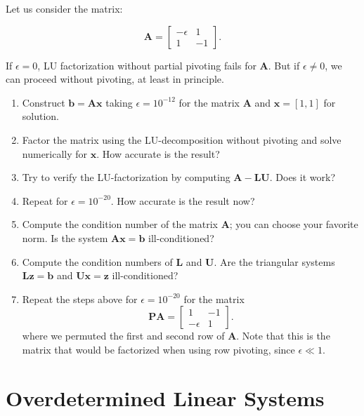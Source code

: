 \begin{exercise} 
    Let us consider the matrix:

    $$
        \mathbf{A} =
        \begin{bmatrix}
        -\epsilon & 1 \\ 
        1 & -1
        \end{bmatrix}.
    $$

    If $\epsilon=0$, LU factorization without partial pivoting fails for $\mathbf{A}$. But if $\epsilon\neq 0$, we can proceed without pivoting, at least in principle.

    \begin{enumerate}
        \item Construct $\mathbf{b}=\mathbf{Ax}$ taking $\epsilon=10^{-12}$ for the matrix $\mathbf{A}$ and $\mathbf{x}=[1,1]$ for solution.
        \item Factor the matrix using the LU-decomposition without pivoting and solve numerically for $\mathbf{x}$. How accurate is the result?
        \item Try to verify the LU-factorization by computing $\mathbf{A}-\mathbf{LU}$. Does it work?
        \item Repeat for $\epsilon=10^{-20}$. How accurate is the result now?
        \item Compute the condition number of the matrix $\mathbf{A}$; you can choose your favorite norm. Is the system $\mathbf{Ax}=\mathbf{b}$ ill-conditioned?
        \item Compute the condition numbers of $\mathbf{L}$ and $\mathbf{U}$. Are the triangular systems $\mathbf{L}\mathbf{z}=\mathbf{b}$ and $\mathbf{U}\mathbf{x}=\mathbf{z}$ ill-conditioned?
        \item Repeat the steps above for $\epsilon=10^{-20}$ for the matrix
        $$
        \mathbf{PA}=
            \begin{bmatrix}
            1 & -1 \\
            -\epsilon & 1 
            \end{bmatrix}.
        $$
        where we permuted the first and second row of $\mathbf{A}$. Note that this is the matrix that would be factorized when using row pivoting, since $\epsilon\ll1$.
    \end{enumerate}

\end{exercise}

\section{Overdetermined Linear Systems}


